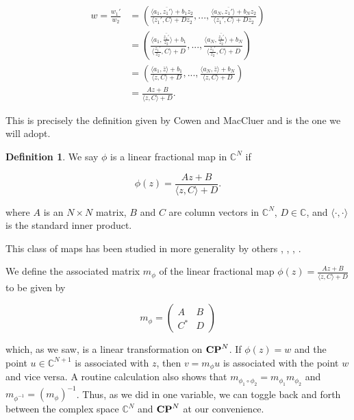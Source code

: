 \documentclass{amsart}
\theoremstyle{theorem}
\theoremstyle{lemma}
\theoremstyle{definition}
\newtheorem*{definition}{Definition}
\begin{document}
\begin{align*}w=\frac{w_1'}{w_2}&=\left(\frac{\langle a_1, \overline{z_1'}\rangle+b_1z_2 }{\langle z_1',C \rangle+Dz_2},...,\frac{\langle a_N, \overline{z_1'}\rangle+b_Nz_2 }{\langle z_1',C\rangle+Dz_2}\right)\\
&=\left(\frac{\langle a_1, \overline{\frac{z_1'}{z_2}}\rangle+b_1 }{\langle\frac{z_1'}{z_2},C\rangle+D},...,\frac{\langle a_N, \overline{\frac{z_1'}{z_2}}\rangle+b_N }{\langle \frac{z_1'}{z_2},C\rangle+D}\right)\\
&=\left(\frac{\langle a_1, \overline{z}\rangle+b_1 }{\langle z,C\rangle+D},...,\frac{\langle a_N, \overline{z}\rangle+b_N }{\langle z,C\rangle+D}\right)\\
&=\frac{Az+B}{\langle z,C\rangle+D}.
\end{align*}

This is precisely the definition given by Cowen and MacCluer \cite{Cowen} and is the one we will adopt.

\begin{definition}
We say $\phi$ is a linear fractional map in $\mathbb{C}^N$ if 

\begin{equation}
\label{LFM}
\phi(z)=\frac{Az+B}{\langle z,C\rangle+D}.
\end{equation}

\noindent where $A$ is an $N \times N$ matrix, $B$ and $C$ are column vectors in $\mathbb{C}^N$, $D \in \mathbb{C}$, and $\langle \cdot, \cdot \rangle$ is the standard inner product.
\end{definition}

This class of maps has been studied in more generality by others \cite{H}, \cite{P}, \cite{S}, \cite{Sm}.

We define the associated matrix $m_{\phi}$ of the linear fractional map $\phi(z)=\frac{Az+B}{\langle z,C\rangle+D}$ to be given by

\begin{equation*}
    m_{\phi} = \begin{pmatrix}
        A & B \\
        C^* & D
     \end{pmatrix}
\end{equation*}

\noindent which, as we saw, is a linear transformation on ${\bf CP}^N$. If $\phi(z)=w$ and the point $u \in \mathbb{C}^{N+1}$ is associated with $z$, then $v=m_{\phi}u$ is associated with the point $w$ and vice versa. A routine calculation also shows that $m_{\phi_1 \circ \phi_2}=m_{\phi_1}m_{\phi_2}$ and $m_{\phi^{-1}}=(m_{\phi})^{-1}$. Thus, as we did in one variable, we can toggle back and forth between the complex space $\mathbb{C}^N$ and ${\bf CP}^N$ at our convenience.
\end{document}
